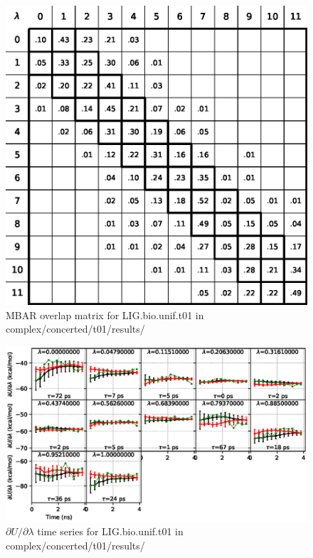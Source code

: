 \documentclass[journal=jctcce,manuscript=article,hyperref=false]{achemso}
\begin{document}
\begin{figure}
\includegraphics[clip,width=6in]{complex.concerted.t01.results..S.eps}\vspace{-0.3cm}
\caption{MBAR overlap matrix for LIG.bio.unif.t01 in complex/concerted/t01/results/}
\end{figure}


\begin{figure}
\includegraphics[clip,width=6in]{complex.concerted.t01.results..DVDLvsT.eps}\vspace{-0.3cm}
\caption{$\partial U/\partial\lambda$ time series for LIG.bio.unif.t01 in complex/concerted/t01/results/}
\end{figure}
\end{document}
